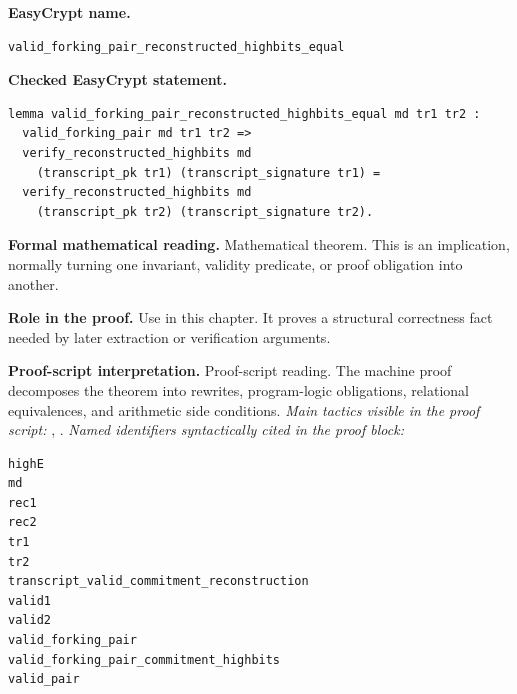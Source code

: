 \begin{formaltheorem}
\noindent\textbf{EasyCrypt name.}
\begin{lstlisting}[language=EasyCrypt,basicstyle=\ttfamily\scriptsize]
valid_forking_pair_reconstructed_highbits_equal
\end{lstlisting}
\noindent\textbf{Checked EasyCrypt statement.}
\begin{lstlisting}[language=EasyCrypt,basicstyle=\ttfamily\scriptsize]
lemma valid_forking_pair_reconstructed_highbits_equal md tr1 tr2 :
  valid_forking_pair md tr1 tr2 =>
  verify_reconstructed_highbits md
    (transcript_pk tr1) (transcript_signature tr1) =
  verify_reconstructed_highbits md
    (transcript_pk tr2) (transcript_signature tr2).
\end{lstlisting}
\noindent\textbf{Formal mathematical reading.}
Mathematical theorem. This is an implication, normally turning one invariant, validity predicate, or proof obligation into another.

\noindent\textbf{Role in the proof.}
Use in this chapter. It proves a structural correctness fact needed by later extraction or verification arguments.

\noindent\textbf{Proof-script interpretation.}
Proof-script reading. The machine proof decomposes the theorem into rewrites, program-logic obligations, relational equivalences, and arithmetic side conditions.
\emph{Main tactics visible in the proof script:} , .
\emph{Named identifiers syntactically cited in the proof block:}
\begin{lstlisting}[language=EasyCrypt,basicstyle=\ttfamily\scriptsize]
highE
md
rec1
rec2
tr1
tr2
transcript_valid_commitment_reconstruction
valid1
valid2
valid_forking_pair
valid_forking_pair_commitment_highbits
valid_pair
\end{lstlisting}

\end{formaltheorem}

